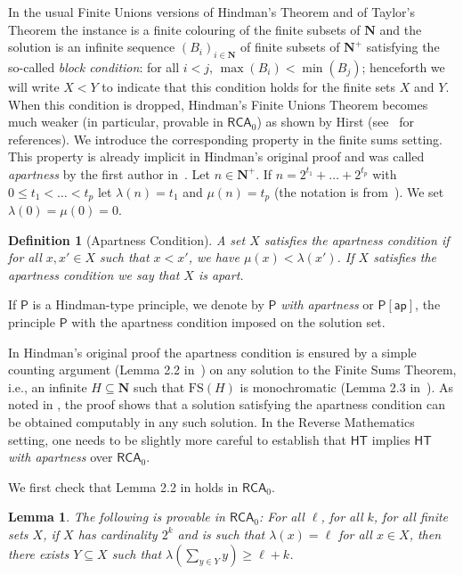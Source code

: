 \documentclass[a4paper,11pt]{article}
\newtheorem{definition}{Definition}
\newtheorem{lemma}{Lemma}
\newcommand\Nat{\mathbf{N}}
\newcommand\RCA{\mathsf{RCA}}
\newcommand\HT{\mathsf{HT}}
\newcommand\FS{\mathrm{FS}}
\newcommand\ap{\mathsf{ap}}
\begin{document}
In the usual Finite Unions versions of Hindman's Theorem and of Taylor's Theorem the instance is a finite colouring of the finite subsets of $\Nat$ and the solution is an infinite sequence $(B_i)_{i\in\Nat}$ of finite subsets of $\Nat^+$ satisfying the so-called {\em block condition}: for all $i <j$, $\max(B_i) < \min(B_j)$; henceforth we will write $X < Y$ to indicate that this condition holds for the finite sets $X$ and $Y$. When this condition is dropped, Hindman's Finite Unions Theorem becomes much weaker (in particular, provable in $\RCA_0$) as shown by Hirst (see~\cite{Car:2021} for references).
We introduce the corresponding property in the finite sums setting. This property is already implicit in Hindman's original proof \cite{Hin:74} and was called {\em apartness} by the first author in~\cite{Car:16:wys}. Let $n\in \Nat^+$. If $n=2^{t_1}+\dots+2^{t_p}$ with $0 \leq t_1 < \dots < t_p$ let $\lambda(n)=t_1$ and $\mu(n)=t_p$ (the notation is from~\cite{Bla-Hir-Sim:87}). We set $\lambda(0)=\mu(0)=0$.

\begin{definition}[Apartness Condition] 
A set $X$ satisfies the apartness condition if for all $x,x'\in X$ such that $x < x'$, we have $\mu(x)<\lambda(x')$. If $X$ satisfies the apartness condition we say that $X$ is apart.
\end{definition}

If $\mathsf{P}$ is a Hindman-type principle, we denote by $\mathsf{P}$ {\em with apartness} or $\mathsf{P}[\ap]$, the principle $\mathsf{P}$ with the apartness condition imposed on the solution set.

In Hindman's original proof the apartness condition is ensured 
by a simple counting argument (Lemma 2.2 in~\cite{Hin:72}) 
on any solution to the Finite Sums Theorem, i.e., an infinite $H\subseteq\Nat$ 
such that $\FS(H)$ is monochromatic (Lemma 2.3 in~\cite{Hin:72}). 
As noted in \cite{Bla-Hir-Sim:87}, the proof shows that a solution satisfying the apartness condition 
can be obtained computably in any such solution. In the Reverse Mathematics setting, one needs to be slightly more
careful to establish that $\HT$ 
implies $\HT$ {\em with apartness} over $\RCA_0$. 

We first check that Lemma 2.2 in \cite{Hin:72} holds in $\RCA_0$.

\begin{lemma}\label{lem:counting} The following is provable in $\RCA_0$: 
For all $\ell$, for all $k$, for all finite sets $X$, if $X$ has cardinality $2^k$ and is such that $\lambda(x)=\ell$ for all $x\in X$, then there exists 
$Y\subseteq X$ such that $\lambda(\sum_{y \in Y} y) \geq \ell + k$.
\end{lemma}
\end{document}
